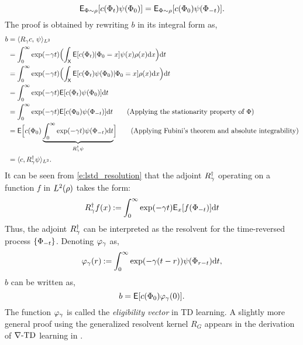 \begin{equation}
{\sf E}_{\Phi \sim \rho}[c(\Phi_t) \psi(\Phi_0)] = {\sf E}_{\Phi \sim \rho} [c(\Phi_0) \psi(\Phi_{-t})].
\end{equation} 
The proof is obtained by rewriting $b$ in its integral form as,
\begin{equation}
\begin{aligned}
b & = \langle R_\discount c, \, \basis \rangle_{L^2} \\
& = \int_0^\infty \exp(-\discount t)  \Bigl(\int_{\state} \Expect[c(\markovstate_t)| \markovstate_0 = x] \basis(x)  \pr(x) \ud x \Bigr) \ud t \\
& = \int_0^\infty \exp(-\discount t)  \Bigl(\int_{\state} \Expect[c(\markovstate_t) \basis(\markovstate_0)| \markovstate_0 = x]  \pr(x) \ud x \Bigr) \ud t \\
& = \int_0^\infty \exp(-\discount t) \Expect[c(\markovstate_t) \basis(\markovstate_0)]\ud t \\
& = \int_0^\infty \exp(-\discount t) \Expect[c(\markovstate_0) \basis(\markovstate_{-t})] \ud t \qquad \text{(Applying the stationarity property of $\markovstate$)}\\
& = \Expect\Bigl[c(\markovstate_0) \underbrace{\int_0^\infty \exp(-\discount t) \basis(\markovstate_{-t})\ud t}_{R^\dagger_\discount \basis}\Bigr]  \qquad \text{(Applying Fubini's theorem and absolute integrability)}\\
& = \langle c, R^\dagger_\discount \basis \rangle_{L^2}.
\label{e:lstd_resolution}
\end{aligned}
\end{equation}
It can be seen from \eqref{e:lstd_resolution} that the adjoint $R^\dagger_\gamma$ operating on a function $f$ in $L^2(\rho)$ takes the form:
\begin{equation}
R^\dagger_\discount f(x) \eqdef \int_0^\infty \exp(-\discount t ) \Expect_x[f(\markovstate_{-t})] \ud t %
\end{equation}
Thus, the adjoint $R^\dagger_\gamma$ can be interpreted as the resolvent for the time-reversed process $\{\Phi_{-t}\}$. 
Denoting $\varphi_\gamma$ as,
\begin{equation}
\eligibvector_\discount(r) \eqdef \int_0^\infty \exp(-\discount (t -r)) \basis(\markovstate_{r-t}) \ud t,
\label{e:lstd_eligib}
\end{equation}
$b$ can be written as,
\begin{equation}
b = \Expect[c(\markovstate_0) \eligibvector_\discount(0)].
\label{e:lstd_b}
\end{equation}
The function $\varphi_\gamma$ is called the \textit{eligibility vector} in TD learning. A slightly more general proof using the generalized resolvent kernel $R_G$ appears in the derivation of $\nabla\text{-TD}$ learning in .

